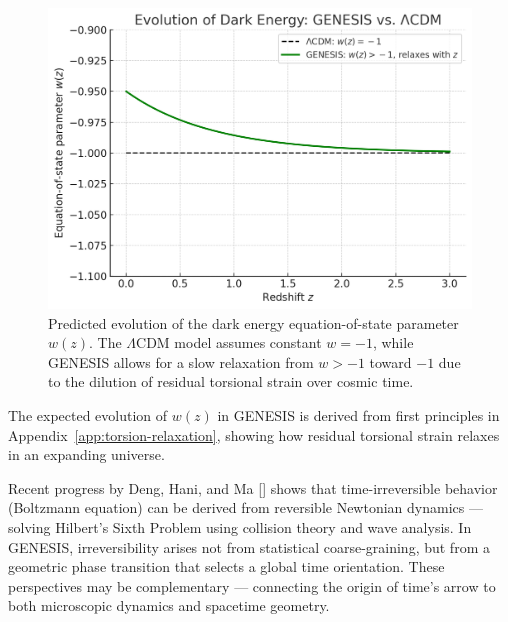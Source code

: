 \documentclass{article}
\begin{document}
\begin{figure}[h!]
  \centering
  \includegraphics[width=0.68\linewidth]{wz_GENESIS_vs_LCDM.png}
  \caption{Predicted evolution of the dark energy equation-of-state parameter $w(z)$.
           The $\Lambda$CDM model assumes constant $w=-1$, while GENESIS allows for a slow relaxation
           from $w>-1$ toward $-1$ due to the dilution of residual torsional strain over cosmic time.}
  \label{fig:wz-comparison}
\end{figure}

The expected evolution of $w(z)$ in GENESIS is derived from first principles in Appendix~\ref{app:torsion-relaxation}, showing how residual torsional strain relaxes in an expanding universe.

\begin{tcolorbox}[colback=white, colframe=yellow!75!black, title=Time asymmetry and Hilbert’s Sixth Problem, boxrule=0.5pt]
Recent progress by Deng, Hani, and Ma [\cite{DengHaniMa2023}] shows that time-irreversible behavior (Boltzmann equation) can be derived from reversible Newtonian dynamics — solving Hilbert’s Sixth Problem using collision theory and wave analysis.  
In GENESIS, irreversibility arises not from statistical coarse-graining, but from a geometric phase transition that selects a global time orientation.  
These perspectives may be complementary — connecting the origin of time’s arrow to both microscopic dynamics and spacetime geometry.
\end{tcolorbox}
\end{document}
